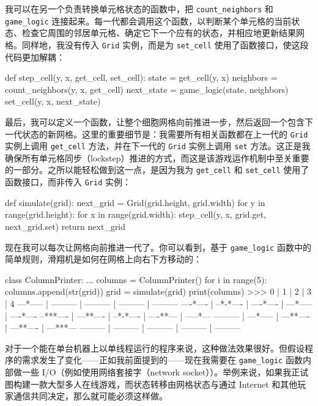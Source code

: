 我可以在另一个负责转换单元格状态的函数中，把 \texttt{count\_neighbors} 和 \texttt{game\_logic} 连接起来。每一代都会调用这个函数，以判断某个单元格的当前状态、检查它周围的邻居单元格、确定它下一个应有的状态，并相应地更新结果网格。同样地，我没有传入 \texttt{Grid} 实例，而是为 \texttt{set\_cell} 使用了函数接口，使这段代码更加解耦：

\begin{codebox}[python]
def step_cell(y, x, get_cell, set_cell):
    state = get_cell(y, x)
    neighbors = count_neighbors(y, x, get_cell)
    next_state = game_logic(state, neighbors)
    set_cell(y, x, next_state)
\end{codebox}

最后，我可以定义一个函数，让整个细胞网格向前推进一步，然后返回一个包含下一代状态的新网格。这里的重要细节是：我需要所有相关函数都在上一代的 \texttt{Grid} 实例上调用 \texttt{get\_cell} 方法，并在下一代的 \texttt{Grid} 实例上调用 \texttt{set} 方法。这正是我确保所有单元格同步（lockstep）推进的方式，而这是该游戏运作机制中至关重要的一部分。之所以能轻松做到这一点，是因为我为 \texttt{get\_cell} 和 \texttt{set\_cell} 使用了函数接口，而非传入 \texttt{Grid} 实例：

\begin{codebox}[python]
def simulate(grid):
    next_grid = Grid(grid.height, grid.width)
    for y in range(grid.height):
        for x in range(grid.width):
            step_cell(y, x, grid.get, next_grid.set)
    return next_grid
\end{codebox}

现在我可以每次让网格向前推进一代了。你可以看到，基于 \texttt{game\_logic} 函数中的简单规则，滑翔机是如何在网格上向右下方移动的：

\begin{codebox}[python]
class ColumnPrinter:
    ...
columns = ColumnPrinter()
for i in range(5):
    columns.append(str(grid))
    grid = simulate(grid)
print(columns)
>>>
    0     |     1     |     2     |     3     |     4
---*----- | --------- | --------- | --------- | ---------
----*---- | --*-*---- | ----*---- | ---*----- | ----*----
--***---- | ---**---- | --*-*---- | ----**--- | -----*---
--------- | ---*----- | ---**---- | ---**---- | ---***---
--------- | --------- | --------- | --------- | ---------
\end{codebox}

对于一个能在单台机器上以单线程运行的程序来说，这种做法效果很好。但假设程序的需求发生了变化——正如我前面提到的——现在我需要在 \texttt{game\_logic} 函数内部做一些 I/O（例如使用网络套接字（network socket））。举例来说，如果我正试图构建一款大型多人在线游戏，而状态转移由网格状态与通过 Internet 和其他玩家通信共同决定，那么就可能必须这样做。

